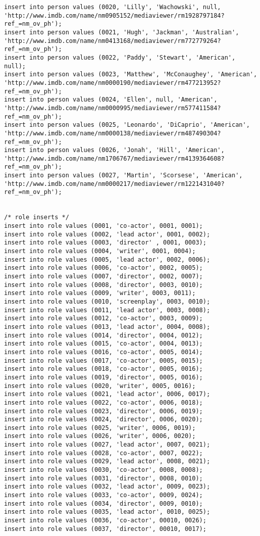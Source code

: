 \documentclass[12pt]{article}
\begin{document}
\begin{lstlisting}
insert into person values (0020, 'Lilly', 'Wachowski', null, 'http://www.imdb.com/name/nm0905152/mediaviewer/rm1928797184?ref_=nm_ov_ph');
insert into person values (0021, 'Hugh', 'Jackman', 'Australian', 'http://www.imdb.com/name/nm0413168/mediaviewer/rm772779264?ref_=nm_ov_ph');
insert into person values (0022, 'Paddy', 'Stewart', 'American', null);
insert into person values (0023, 'Matthew', 'McConaughey', 'American', 'http://www.imdb.com/name/nm0000190/mediaviewer/rm477213952?ref_=nm_ov_ph');
insert into person values (0024, 'Ellen', null, 'American', 'http://www.imdb.com/name/nm0000995/mediaviewer/rm577411584?ref_=nm_ov_ph');
insert into person values (0025, 'Leonardo', 'DiCaprio', 'American', 'http://www.imdb.com/name/nm0000138/mediaviewer/rm487490304?ref_=nm_ov_ph');
insert into person values (0026, 'Jonah', 'Hill', 'American', 'http://www.imdb.com/name/nm1706767/mediaviewer/rm4139364608?ref_=nm_ov_ph');
insert into person values (0027, 'Martin', 'Scorsese', 'American', 'http://www.imdb.com/name/nm0000217/mediaviewer/rm1221431040?ref_=nm_ov_ph');


/* role inserts */
insert into role values (0001, 'co-actor', 0001, 0001);
insert into role values (0002, 'lead actor', 0001, 0002);
insert into role values (0003, 'director' , 0001, 0003);
insert into role values (0004, 'writer', 0001, 0004);
insert into role values (0005, 'lead actor', 0002, 0006);
insert into role values (0006, 'co-actor', 0002, 0005);
insert into role values (0007, 'director', 0002, 0007);
insert into role values (0008, 'director', 0003, 0010);
insert into role values (0009, 'writer', 0003, 0011);
insert into role values (0010, 'screenplay', 0003, 0010);
insert into role values (0011, 'lead actor', 0003, 0008);
insert into role values (0012, 'co-actor', 0003, 0009);
insert into role values (0013, 'lead actor', 0004, 0008);
insert into role values (0014, 'director', 0004, 0012);
insert into role values (0015, 'co-actor', 0004, 0013);
insert into role values (0016, 'co-actor', 0005, 0014);
insert into role values (0017, 'co-actor', 0005, 0015);
insert into role values (0018, 'co-actor', 0005, 0016);
insert into role values (0019, 'director', 0005, 0016);
insert into role values (0020, 'writer', 0005, 0016);
insert into role values (0021, 'lead actor', 0006, 0017);
insert into role values (0022, 'co-actor', 0006, 0018);
insert into role values (0023, 'director', 0006, 0019);
insert into role values (0024, 'director', 0006, 0020);
insert into role values (0025, 'writer', 0006, 0019);
insert into role values (0026, 'writer', 0006, 0020);
insert into role values (0027, 'lead actor', 0007, 0021);
insert into role values (0028, 'co-actor', 0007, 0022);
insert into role values (0029, 'lead actor', 0008, 0021);
insert into role values (0030, 'co-actor', 0008, 0008);
insert into role values (0031, 'director', 0008, 0010);
insert into role values (0032, 'lead actor', 0009, 0023);
insert into role values (0033, 'co-actor', 0009, 0024);
insert into role values (0034, 'director', 0009, 0010);
insert into role values (0035, 'lead actor', 0010, 0025);
insert into role values (0036, 'co-actor', 00010, 0026);
insert into role values (0037, 'director', 00010, 0017);





\end{lstlisting}
\end{document}
